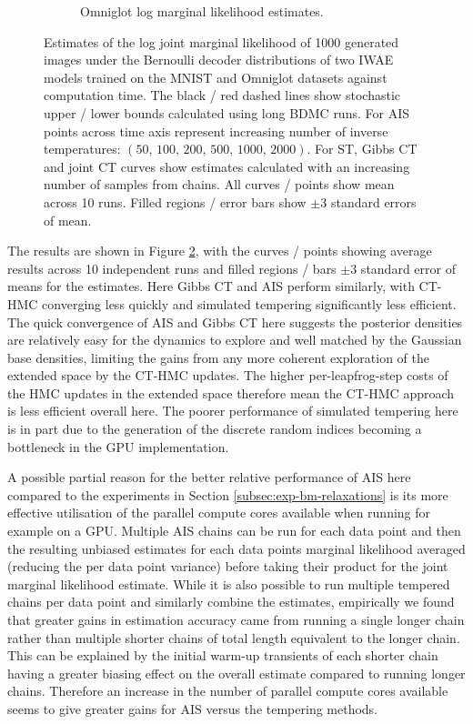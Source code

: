 \begin{figure}
\begin{subfigure}[t]{\linewidth}
\caption{Omniglot log marginal likelihood estimates.}\label{sfig:omni-log-marg-lik}
\vskip 0pt
\end{subfigure}
\caption[\acs{IWAE} marginal likelihood estimates.]{Estimates of the log joint marginal likelihood of 1000 generated images under the Bernoulli decoder distributions of two \ac{IWAE} models trained on the MNIST and Omniglot datasets against computation time. The black / red dashed lines show stochastic upper / lower bounds calculated using long \ac{BDMC} runs. For \ac{AIS} points across time axis represent increasing number of inverse temperatures: $(50,\,100,\,200,\,500,\,1000,\,2000)$. For \ac{ST}, Gibbs \ac{CT} and joint \ac{CT} curves show estimates calculated with an increasing number of samples from chains. All curves / points show mean across 10 runs. Filled regions / error bars show $\pm 3$ standard errors of mean.
}
\label{fig:iwae-marginal-likelihood-results}
\end{figure}

The results are shown in Figure \ref{fig:iwae-marginal-likelihood-results}, with the curves / points showing average results across 10 independent runs and filled regions / bars $\pm 3$ standard error of means for the estimates. Here Gibbs \ac{CT} and \ac{AIS} perform similarly, with \ac{CT-HMC} converging less quickly and simulated tempering significantly less efficient. The quick convergence of \ac{AIS} and Gibbs \ac{CT} here suggests the posterior densities are relatively easy for the dynamics to explore and well matched by the Gaussian base densities, limiting the gains from any more coherent exploration of the extended space by the \ac{CT-HMC} updates. The higher per-leapfrog-step costs of the \ac{HMC} updates in the extended space therefore mean the \ac{CT-HMC} approach is less efficient overall here. The poorer performance of simulated tempering here is in part due to the generation of the discrete random indices becoming a bottleneck in the \ac{GPU} implementation.

A possible partial reason for the better relative performance of \ac{AIS} here compared to the experiments in Section \ref{subsec:exp-bm-relaxations} is its more effective utilisation of the parallel compute cores available when running for example on a \ac{GPU}. Multiple \ac{AIS} chains can be run for each data point and then the resulting unbiased estimates for each data points marginal likelihood averaged (reducing the per data point variance) before taking their product for the joint marginal likelihood estimate. While it is also possible to run multiple tempered chains per data point and similarly combine the estimates, empirically we found that greater gains in estimation accuracy came from running a single longer chain rather than multiple shorter chains of total length equivalent to the longer chain. This can be explained by the initial warm-up transients of each shorter chain having a greater biasing effect on the overall estimate compared to running longer chains. Therefore an increase in the number of parallel compute cores available seems to give greater gains for \ac{AIS} versus the tempering methods.

